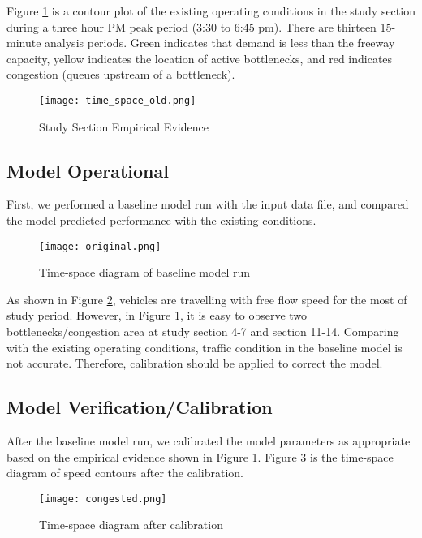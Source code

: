 \documentclass{article}
\begin{document}
Figure \ref{fig:time-space_old} is a contour plot of the existing operating conditions in the study section during a three hour PM peak period (3:30 to 6:45 pm). There are thirteen 15-minute analysis periods. Green indicates that demand is less than the freeway capacity, yellow indicates the location of active bottlenecks, and red indicates congestion (queues upstream of a bottleneck). 
\begin{figure}[!htbp]
    \centering
    \texttt{[image: time\_space\_old.png]}
    \caption{Study Section Empirical Evidence}
    \label{fig:time-space_old}
\end{figure}


\subsection{Model Operational}
First, we performed a baseline model run with the input data file, and compared the model predicted performance with the existing conditions.
\begin{figure}
    \centering
    \texttt{[image: original.png]}
    \caption{Time-space diagram of baseline model run}
    \label{fig:time-space}
\end{figure}
As shown in Figure \ref{fig:time-space}, vehicles are travelling with free flow speed for the most of study period. However, in Figure \ref{fig:time-space_old}, it is easy to observe two bottlenecks/congestion area at study section 4-7 and section 11-14. Comparing with the existing operating conditions, traffic condition in the baseline model is not accurate. Therefore, calibration should be applied to correct the model.


\subsection{Model Verification/Calibration}
After the baseline model run, we calibrated the model parameters as appropriate based on the empirical evidence shown in Figure \ref{fig:time-space_old}. Figure \ref{fig:congested_1} is the time-space diagram of speed contours after the calibration. 

\begin{figure}[!htbp]
    \centering
    \texttt{[image: congested.png]}
    \caption{Time-space diagram after calibration}
    \label{fig:congested_1}
\end{figure}
\end{document}
